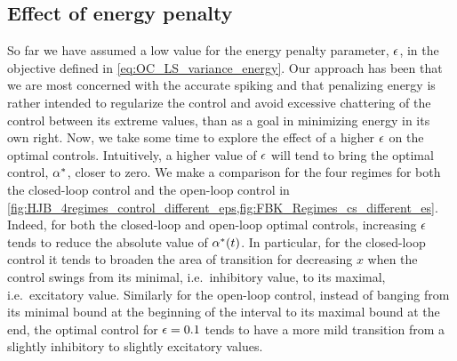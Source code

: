\documentclass[12pt]{iopart}
\begin{document}
\subsection{Effect of energy penalty}
\label{sec:effect_of_eps}
So far we have assumed a low value for the energy penalty parameter,
${\epsilon}$, in the objective defined in \cref{eq:OC_LS_variance_energy}. Our
approach has been that we are most concerned with the accurate spiking and that
penalizing energy is rather intended to regularize the control and avoid
excessive chattering of the control between its extreme values, than as a goal
in minimizing energy in its own right. Now, we take some time to explore the
effect of a higher ${\epsilon}$ on the optimal controls. Intuitively, a
higher value of ${\epsilon}$ will tend to bring the optimal control, ${\alpha}^*$, closer
to zero. We make a comparison for the four regimes for both the
closed-loop control and the open-loop control in
\cref{fig:HJB_4regimes_control_different_eps,fig:FBK_Regimes_cs_different_es}.
Indeed, for both the closed-loop and open-loop optimal controls, increasing
${\epsilon}$ tends to reduce the absolute value of ${\alpha}^*(t)$. In particular, for the
closed-loop control it tends to broaden the area of transition for
decreasing $x$ when the control swings from its minimal, i.e.\ inhibitory value,
to its maximal, i.e.\ excitatory value. Similarly for the open-loop control,
instead of banging from its minimal bound at the beginning of the interval to
its maximal bound at the end, the optimal control for ${\epsilon} = 0.1$ tends to have a
more mild transition from a slightly inhibitory to slightly excitatory
values.
\end{document}
